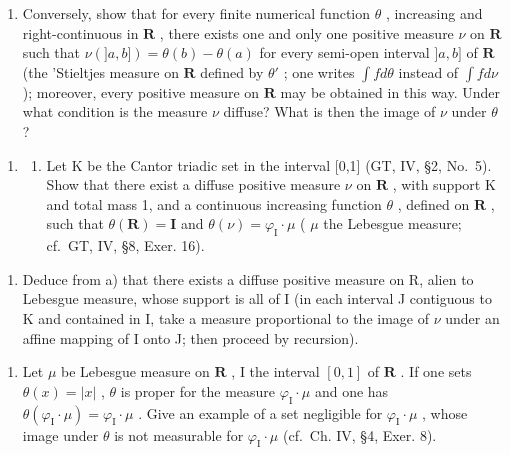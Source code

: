 \begin{enumerate}
\def\labelenumi{\alph{enumi})}
\setcounter{enumi}{2}
\tightlist
\item
  Conversely, show that for every finite numerical function \(\theta\) , increasing and right-continuous in \(\mathbf{R}\) , there exists one and only one positive measure \(\nu\) on \(\mathbf{R}\) such that \(\nu(]a,b]) = \theta(b) - \theta(a)\) for every semi-open interval \(]a,b]\) of \(\mathbf{R}\) (the 'Stieltjes measure on \(\mathbf{R}\) defined by \(\theta'\) ; one writes \(\int f d\theta\) instead of \(\int f d\nu\) ); moreover, every positive measure on \(\mathbf{R}\) may be obtained in this way. Under what condition is the measure \(\nu\) diffuse? What is then the image of \(\nu\) under \(\theta\) ?
\end{enumerate}

\begin{enumerate}
\def\labelenumi{\arabic{enumi})}
\setcounter{enumi}{5}
\tightlist
\item
  \begin{enumerate}
  \def\labelenumii{\alph{enumii})}
  \tightlist
  \item
    Let K be the Cantor triadic set in the interval {[}0,1{]} (GT, IV, §2, No.~5). Show that there exist a diffuse positive measure \(\nu\) on \(\mathbf{R}\) , with support K and total mass 1, and a continuous increasing function \(\theta\) , defined on \(\mathbf{R}\) , such that \(\theta(\mathbf{R}) = \mathbf{I}\) and \(\theta(\nu) = \varphi_{\mathrm{I}} \cdot \mu\) ( \(\mu\) the Lebesgue measure; cf.~GT, IV, §8, Exer. 16).
  \end{enumerate}
\end{enumerate}

\begin{enumerate}
\def\labelenumi{\alph{enumi})}
\setcounter{enumi}{1}
\tightlist
\item
  Deduce from a) that there exists a diffuse positive measure on R, alien to Lebesgue measure, whose support is all of I (in each interval J contiguous to K and contained in I, take a measure proportional to the image of \(\nu\) under an affine mapping of I onto J; then proceed by recursion).
\end{enumerate}

\begin{enumerate}
\def\labelenumi{\arabic{enumi})}
\setcounter{enumi}{6}
\tightlist
\item
  Let \(\mu\) be Lebesgue measure on \(\mathbf{R}\) , I the interval \([0,1]\) of \(\mathbf{R}\) . If one sets \(\theta(x) = |x|\) , \(\theta\) is proper for the measure \(\varphi_{\mathrm{I}} \cdot \mu\) and one has \(\theta(\varphi_{\mathrm{I}} \cdot \mu) = \varphi_{\mathrm{I}} \cdot \mu\) . Give an example of a set negligible for \(\varphi_{\mathrm{I}} \cdot \mu\) , whose image under \(\theta\) is not measurable for \(\varphi_{\mathrm{I}} \cdot \mu\) (cf.~Ch. IV, §4, Exer. 8).
\end{enumerate}

